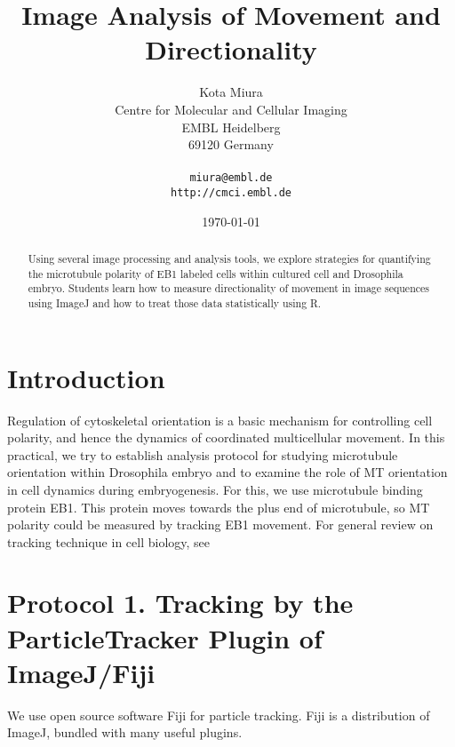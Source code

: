\documentclass[11pnt]{article}
\begin{document}
\author{Kota Miura\\
  Centre for Molecular and Cellular Imaging\\
  EMBL Heidelberg\\
  69120  Germany\\
  \\
  \texttt{miura@embl.de}\\
  \texttt{http://cmci.embl.de}}
\date{\today}
\title{Image Analysis of Movement and Directionality}
\maketitle
\begin{abstract}
Using several image processing and analysis tools, we explore strategies for quantifying the microtubule polarity of EB1 labeled cells within cultured cell and Drosophila embryo. Students learn how to measure directionality of movement in image sequences using ImageJ and how to treat those data statistically using R. 
\end{abstract}

\section{Introduction}

Regulation of cytoskeletal orientation is a basic mechanism for controlling cell polarity, and hence the dynamics of coordinated multicellular movement. In this practical, we try to establish analysis protocol for studying microtubule orientation within Drosophila embryo and to examine the role of MT orientation in cell dynamics during embryogenesis. For this, we use microtubule binding protein EB1. This protein moves towards the plus end of microtubule, so MT polarity could be measured by tracking EB1 movement. For general review on tracking technique in cell biology, see \citep{Miura2005,Meijering2006a,Meijering2012} 


\section{Protocol 1. Tracking by the ParticleTracker Plugin of ImageJ/Fiji}

We use open source software Fiji for particle tracking. Fiji is a distribution of ImageJ, bundled with many useful plugins. 
\end{document}
